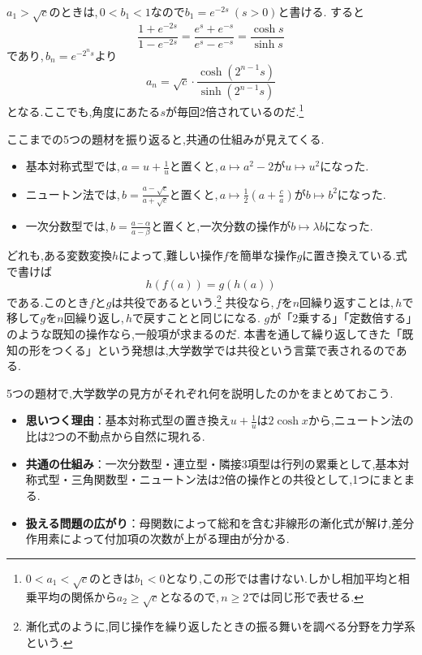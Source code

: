 $a_1>\sqrt c$のときは,\,$0<b_1<1$なので$b_1=e^{-2s}\ (s>0)$と書ける.
すると
\[
  \frac{1+e^{-2s}}{1-e^{-2s}}=\frac{e^s+e^{-s}}{e^s-e^{-s}}=\frac{\cosh s}{\sinh s}
\]
であり,\,$b_n=e^{-2^ns}$より
\[
  a_n=\sqrt c\cdot\frac{\cosh(2^{n-1}s)}{\sinh(2^{n-1}s)}
\]
となる.ここでも,角度にあたる$s$が毎回2倍されているのだ.\footnote{$0<a_1<\sqrt c$のときは$b_1<0$となり,この形では書けない.しかし相加平均と相乗平均の関係から$a_2\ge\sqrt c$となるので,\,$n\ge2$では同じ形で表せる.}

ここまでの5つの題材を振り返ると,共通の仕組みが見えてくる.
\begin{itemize}
  \item 基本対称式型では,\,$a=u+\frac1u$と置くと,\,$a\mapsto a^2-2$が$u\mapsto u^2$になった.
  \item ニュートン法では,\,$b=\frac{a-\sqrt c}{a+\sqrt c}$と置くと,\,$a\mapsto\frac12\left(a+\frac ca\right)$が$b\mapsto b^2$になった.
  \item 一次分数型では,\,$b=\frac{a-\alpha}{a-\beta}$と置くと,一次分数の操作が$b\mapsto\lambda b$になった.
\end{itemize}
どれも,ある変数変換$h$によって,難しい操作$f$を簡単な操作$g$に置き換えている.式で書けば
\[
  h(f(a))=g(h(a))
\]
である.このとき$f$と$g$は共役であるという.\footnote{漸化式のように,同じ操作を繰り返したときの振る舞いを調べる分野を力学系という.}
共役なら,\,$f$を$n$回繰り返すことは,\,$h$で移して$g$を$n$回繰り返し,\,$h$で戻すことと同じになる.
$g$が「2乗する」「定数倍する」のような既知の操作なら,一般項が求まるのだ.
本書を通して繰り返してきた「既知の形をつくる」という発想は,大学数学では共役という言葉で表されるのである.

5つの題材で,大学数学の見方がそれぞれ何を説明したのかをまとめておこう.
\begin{itemize}
  \item \textbf{思いつく理由}：基本対称式型の置き換え$u+\frac1u$は$2\cosh x$から,ニュートン法の比は2つの不動点から自然に現れる.
  \item \textbf{共通の仕組み}：一次分数型・連立型・隣接3項型は行列の累乗として,基本対称式型・三角関数型・ニュートン法は2倍の操作との共役として,1つにまとまる.
  \item \textbf{扱える問題の広がり}：母関数によって総和を含む非線形の漸化式が解け,差分作用素によって付加項の次数が上がる理由が分かる.
\end{itemize}
